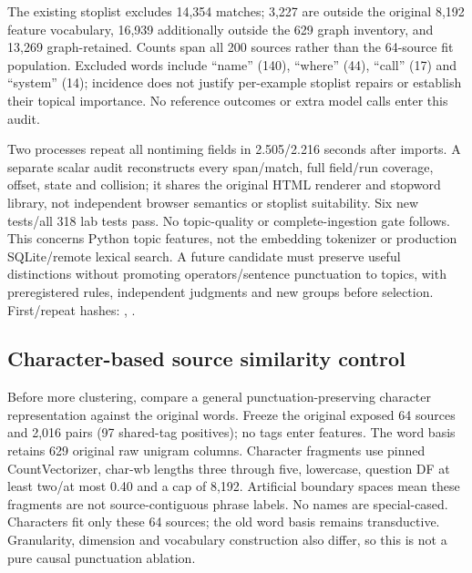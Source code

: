 \documentclass[11pt]{article}
\begin{document}
The existing stoplist excludes 14,354 matches; 3,227 are outside the original
8,192 feature vocabulary, 16,939 additionally outside the 629 graph inventory,
and 13,269 graph-retained. Counts span all 200 sources rather than the 64-source
fit population. Excluded words include ``name'' (140), ``where'' (44), ``call''
(17) and ``system'' (14); incidence does not justify per-example stoplist repairs
or establish their topical importance. No reference outcomes or extra model
calls enter this audit.

Two processes repeat all nontiming fields in 2.505/2.216 seconds after imports.
A separate scalar audit reconstructs every span/match, full field/run coverage,
offset, state and collision; it shares the original HTML renderer and stopword
library, not independent browser semantics or stoplist suitability. Six new
tests/all 318 lab tests pass. No topic-quality or complete-ingestion gate follows.
This concerns Python topic features, not the embedding tokenizer or production
SQLite/remote lexical search. A future candidate must preserve useful distinctions
without promoting operators/sentence punctuation to topics, with preregistered
rules, independent judgments and new groups before selection. First/repeat hashes:
,
.

\subsection{Character-based source similarity control}
Before more clustering, compare a general punctuation-preserving character
representation against the original words. Freeze the original exposed
64 sources and 2,016 pairs (97 shared-tag positives); no tags enter features.
The word basis retains 629 original raw unigram columns. Character fragments
use pinned CountVectorizer\cite{sklearncount}, char-wb lengths three through
five, lowercase, question DF at least two/at most 0.40 and a cap of 8,192.
Artificial boundary spaces mean these fragments are not source-contiguous
phrase labels. No names are special-cased. Characters fit only these 64 sources;
the old word basis remains transductive. Granularity, dimension and vocabulary
construction also differ, so this is not a pure causal punctuation ablation.
\end{document}
